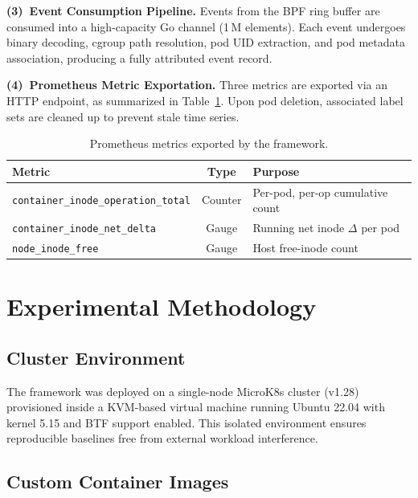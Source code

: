\documentclass[conference]{IEEEtran}
\begin{document}
\textbf{(3)~Event Consumption Pipeline.} Events from the BPF ring buffer are consumed into a high-capacity Go channel (1\,M elements). Each event undergoes binary decoding, cgroup path resolution, pod UID extraction, and pod metadata association, producing a fully attributed event record.

\textbf{(4)~Prometheus Metric Exportation.} Three metrics are exported via an HTTP endpoint, as summarized in Table~\ref{tab:metrics}. Upon pod deletion, associated label sets are cleaned up to prevent stale time series.

\begin{table}[t]
\centering
\caption{Prometheus metrics exported by the framework.}
\label{tab:metrics}
\small
\begin{tabular}{@{}p{3.8cm}cl@{}}
\toprule
\textbf{Metric} & \textbf{Type} & \textbf{Purpose} \\
\midrule
\texttt{container\_inode\_}\newline\texttt{operation\_total} & Counter & Per-pod, per-op cumulative count \\
\midrule
\texttt{container\_inode\_}\newline\texttt{net\_delta} & Gauge & Running net inode $\Delta$ per pod \\
\midrule
\texttt{node\_inode\_free} & Gauge & Host free-inode count \\
\bottomrule
\end{tabular}
\end{table}


\section{Experimental Methodology}
\label{sec:methodology}

\subsection{Cluster Environment}
\label{subsec:cluster}

The framework was deployed on a single-node MicroK8s cluster (v1.28) provisioned inside a KVM-based virtual machine running Ubuntu 22.04 with kernel 5.15 and BTF support enabled. This isolated environment ensures reproducible baselines free from external workload interference.

\subsection{Custom Container Images}
\label{subsec:images}
\end{document}
